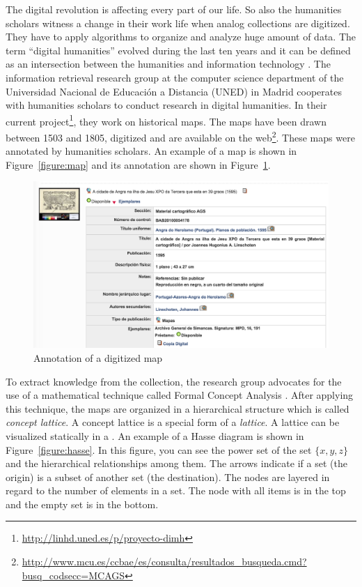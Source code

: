 \documentclass[11pt]{report}
\begin{document}
The digital revolution is affecting every part of our life. So also the humanities scholars witness a change in their work life when analog collections are digitized. They have to apply algorithms to organize and analyze huge amount of data. The term ``digital humanities'' evolved during the last ten years and it can be defined as an intersection between the humanities and information technology  \cite{Svensson2010}. The information retrieval research group at the computer science department of the Universidad Nacional de Educación a Distancia (UNED) in Madrid cooperates with humanities scholars to conduct research in digital humanities. In their current project\footnote{\url{http://linhd.uned.es/p/proyecto-dimh}}, they work on historical maps. The maps have been drawn between 1503 and 1805, digitized and are available on the web\footnote{\url{http://www.mcu.es/ccbae/es/consulta/resultados_busqueda.cmd?busq_codsecc=MCAGS}}. These maps were annotated by humanities scholars. An example of a map is shown in Figure~\ref{figure:map} and its annotation are shown in Figure~\ref{figure:metadata}.\\

\begin{figure}[!ht]
	\centering
	\includegraphics[width=\linewidth]{./images/metadata}
\caption{Annotation of a digitized map}
\label{figure:metadata}
\end{figure}

To extract knowledge from the collection, the research group advocates \cite{Castellanos,Cigarran} for the use of a mathematical technique called Formal Concept Analysis \cite{Ganter2012}. After applying this technique, the maps are organized in a hierarchical structure which is called \textit{concept lattice}. A concept lattice is a special form of a \textit{lattice}. A lattice can be visualized statically in a . An example of a Hasse diagram is shown in Figure~\ref{figure:hasse}. In this figure, you can see the power set of the set $\{x,y,z\}$ and the hierarchical relationships among them. The arrows indicate if a set (the origin) is a subset of another set (the destination). The nodes are layered in regard to the number of elements in a set. The node with all items is in the top and the empty set is in the bottom.\\
\end{document}
